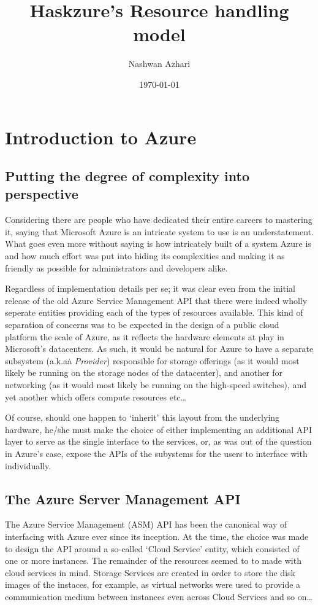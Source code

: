 \documentclass[11pt]{article}
\begin{document}
\date{\today{}}
\title{Haskzure's Resource handling model}
\author{Nashwan Azhari}


\maketitle{}
\newpage

\tableofcontents{}
\newpage

\section{Introduction to Azure}

\subsection{Putting the degree of complexity into perspective}

Considering there are people who have dedicated their entire careers to
mastering it, saying that Microsoft Azure is an intricate system to
use is an understatement. What goes even more without saying is how intricately
built of a system Azure is and how much effort was put into hiding its
complexities and making it as friendly as possible for administrators and
developers alike.

Regardless of implementation details per se; it was clear even from the initial
release of the old Azure Service Management API that there were indeed wholly
seperate entities providing each of the types of resources available. This kind
of separation of concerns was to be expected in the design of a public cloud
platform the scale of Azure, as it reflects the hardware elements at play in
Microsoft's datacenters. As such, it would be natural for Azure to have a
separate subsystem (a.k.a\. a \textit{Provider}) responsible for storage
offerings (as it would most likely be running on the storage nodes of the
datacenter), and another for networking (as it would most likely be running on
the high-speed switches), and yet another which offers compute resources etc\ldots

Of course, should one happen to `inherit' this layout from the underlying
hardware, he/she must make the choice of either implementing an additional API
layer to serve as the single interface to the services, or, as was out of the
question in Azure's case, expose the APIs of the subystems for the users to
interface with individually.

\subsection{The Azure Server Management API}
The Azure Service Management (ASM) API has been the canonical way of
interfacing with Azure ever since its inception. At the time, the choice was
made to design the API around a so-called `Cloud Service' entity, which
consisted of one or more instances. The remainder of the resources seemed to
to made with cloud services in mind. Storage Services are created in order to
store the disk images of the instaces, for example, as virtual networks were
used to provide a communication medium between instances even across Cloud
Services and so on\ldots
\end{document}
